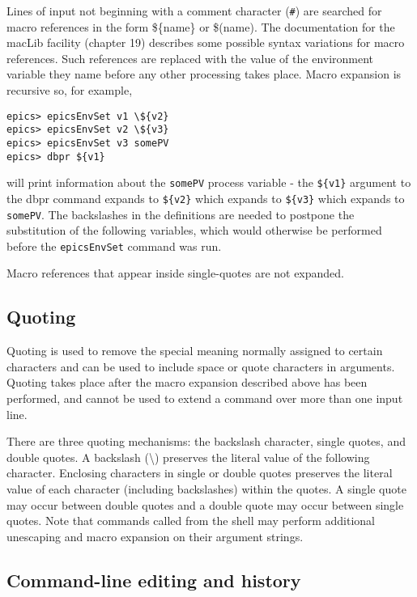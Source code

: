 Lines of input not beginning with a comment character (\verb|#|) are searched for macro references in the form \$\{name\} or \$(name).
The documentation for the macLib facility (chapter 19) describes some possible syntax variations for macro references.
Such references are replaced with the value of the environment variable they name before any other processing takes place.
Macro expansion is recursive so, for example,

\begin{verbatim}
epics> epicsEnvSet v1 \${v2}
epics> epicsEnvSet v2 \${v3}
epics> epicsEnvSet v3 somePV
epics> dbpr ${v1}
\end{verbatim}

will print information about the \verb|somePV| process variable - the \verb|${v1}| argument to the dbpr command expands to \verb|${v2}| which expands to \verb|${v3}| which expands to \verb|somePV|.
The backslashes in the definitions are needed to postpone the substitution of the following variables, which would otherwise be performed before the \verb|epicsEnvSet| command was run.

Macro references that appear inside single-quotes are not expanded.

\subsection{Quoting}

Quoting is used to remove the special meaning normally assigned to certain characters and can be used to include space or quote characters in arguments.
Quoting takes place after the macro expansion described above has been performed, and cannot be used to extend a command over more than one input line.

There are three quoting mechanisms: the backslash character, single quotes, and double quotes.
A backslash (\textbackslash{}) preserves the literal value of the following character.
Enclosing characters in single or double quotes preserves the literal value of each character (including backslashes) within the quotes.
A single quote may occur between double quotes and a double quote may occur between single quotes.
Note that commands called from the shell may perform additional unescaping and macro expansion on their argument strings.

\subsection{Command-line editing and history}

